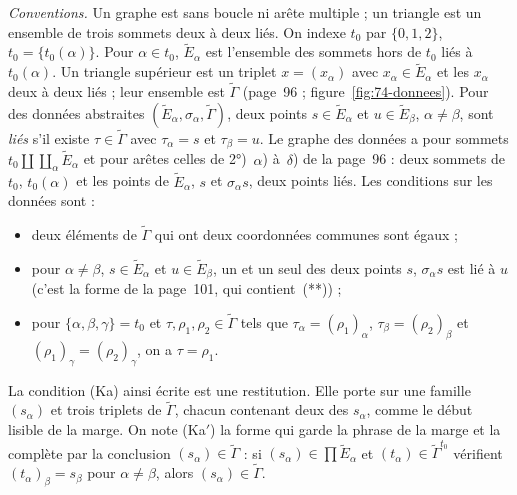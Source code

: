 \noindent\emph{Conventions.} Un graphe est sans boucle ni arête multiple ; un triangle est un ensemble de trois sommets deux à deux liés. On indexe $t_0$ par $\{0, 1, 2\}$, $t_0 = \{t_0(\alpha)\}$. Pour $\alpha \in t_0$, $\widetilde E_\alpha$ est l'ensemble des sommets hors de $t_0$ liés à $t_0(\alpha)$. Un triangle supérieur est un triplet $x = (x_\alpha)$ avec $x_\alpha \in \widetilde E_\alpha$ et les $x_\alpha$ deux à deux liés ; leur ensemble est $\widetilde\Gamma$ (page~96 ; figure~\ref{fig:74-donnees}). Pour des données abstraites $(\widetilde E_\alpha, \sigma_\alpha, \widetilde\Gamma)$, deux points $s \in \widetilde E_\alpha$ et $u \in \widetilde E_\beta$, $\alpha \neq \beta$, sont \emph{liés} s'il existe $\tau \in \widetilde\Gamma$ avec $\tau_\alpha = s$ et $\tau_\beta = u$. Le graphe des données a pour sommets $t_0 \amalg \coprod_\alpha \widetilde E_\alpha$ et pour arêtes celles de 2°)~$\alpha$) à~$\delta$) de la page~96 : deux sommets de $t_0$, $t_0(\alpha)$ et les points de $\widetilde E_\alpha$, $s$ et $\sigma_\alpha s$, deux points liés. Les conditions sur les données sont :
\begin{itemize}
\item[(*)] deux éléments de $\widetilde\Gamma$ qui ont deux coordonnées communes sont égaux ;
\item[($\beta_{\widetilde\Gamma}$)] pour $\alpha \neq \beta$, $s \in \widetilde E_\alpha$ et $u \in \widetilde E_\beta$, un et un seul des deux points $s$, $\sigma_\alpha s$ est lié à $u$ (c'est la forme de la page~101, qui contient~(**)) ;
\item[(Ka)] pour $\{\alpha, \beta, \gamma\} = t_0$ et $\tau, \rho_1, \rho_2 \in \widetilde\Gamma$ tels que $\tau_\alpha = (\rho_1)_\alpha$, $\tau_\beta = (\rho_2)_\beta$ et $(\rho_1)_\gamma = (\rho_2)_\gamma$, on a $\tau = \rho_1$.
\end{itemize}
La condition (Ka) ainsi écrite est une restitution. Elle porte sur une famille $(s_\alpha)$ et trois triplets de $\widetilde\Gamma$, chacun contenant deux des $s_\alpha$, comme le début lisible de la marge. On note (Ka$'$) la forme qui garde la phrase de la marge et la complète par la conclusion $(s_\alpha) \in \widetilde\Gamma$ : si $(s_\alpha) \in \prod \widetilde E_\alpha$ et $(t_\alpha) \in \widetilde\Gamma^{t_0}$ vérifient $(t_\alpha)_\beta = s_\beta$ pour $\alpha \neq \beta$, alors $(s_\alpha) \in \widetilde\Gamma$.

